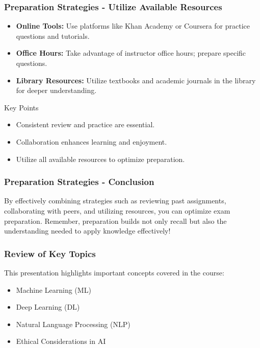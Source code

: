 \documentclass{beamer}
\begin{document}
\begin{frame}[fragile]
    \frametitle{Preparation Strategies - Utilize Available Resources}
    \begin{itemize}
        \item \textbf{Online Tools:} Use platforms like Khan Academy or Coursera for practice questions and tutorials.
        \item \textbf{Office Hours:} Take advantage of instructor office hours; prepare specific questions.
        \item \textbf{Library Resources:} Utilize textbooks and academic journals in the library for deeper understanding.
    \end{itemize}
    
    \begin{block}{Key Points}
        \begin{itemize}
            \item Consistent review and practice are essential.
            \item Collaboration enhances learning and enjoyment.
            \item Utilize all available resources to optimize preparation.
        \end{itemize}
    \end{block}
\end{frame}

\begin{frame}[fragile]
    \frametitle{Preparation Strategies - Conclusion}
    By effectively combining strategies such as reviewing past assignments, collaborating with peers, and utilizing resources, you can optimize exam preparation. Remember, preparation builds not only recall but also the understanding needed to apply knowledge effectively!
\end{frame}

\begin{frame}[fragile]
    \frametitle{Review of Key Topics}
    This presentation highlights important concepts covered in the course:
    \begin{itemize}
        \item Machine Learning (ML)
        \item Deep Learning (DL)
        \item Natural Language Processing (NLP)
        \item Ethical Considerations in AI
    \end{itemize}
\end{frame}
\end{document}

